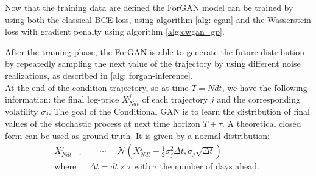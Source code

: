Now that the training data are defined the ForGAN model can be trained by using both the classical BCE loss, using algorithm \ref{alg: cgan}
and the Wasserstein loss with gradient penalty using algorithm \ref{alg:cwgan_gp}.
 




After the training phase, the ForGAN is able to generate the future distribution by repeatedly sampling the next value of the trajectory by using different noise realizations, as described in \ref{alg: forgan-inference}.\\
At the end of the condition trajectory, so at time $T=N dt$, we have the following information: the final log-price $X_{Ndt}^j$ of each trajectory $j$ and the corresponding volatility $\sigma_j$.
The goal of the Conditional GAN is to learn the distribution of final values of the stochastic process at next time horizon $T + \tau$. 
A theoretical closed form can be used as ground truth. It is given by a normal distribution:
\begin{equation}
    \begin{aligned}
    X_{Ndt + \tau}^j & \quad \sim \quad \mathcal{N}(X_{Ndt}^j - \frac{1}{2}\sigma_j^2 \Delta t, \sigma_j \sqrt{\Delta t})\\
    \text{where } &\Delta t = dt \times \tau \text{ with $\tau$ the number of days ahead. }
    \end{aligned}
\end{equation}



